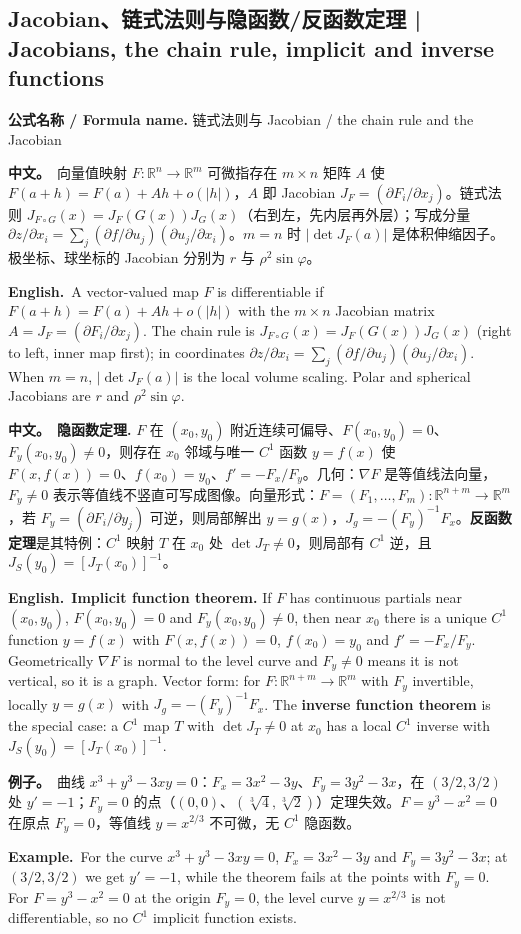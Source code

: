 \documentclass[UTF8,11pt,a4paper]{ctexart}
\newcommand{\R}{\mathbb{R}}
\newcommand{\BOTH}[2]{\par\noindent\textbf{中文。}\ #1\par\noindent\textbf{English.}\ #2\par}
\newcommand{\EX}[2]{\par\noindent\textbf{例子。}\ #1\par\noindent\textbf{Example.}\ #2\par}
\newcommand{\FORMULA}[2]{\par\noindent\textbf{公式名称 / Formula name.} #1 / #2\par}
\begin{document}
\subsection{Jacobian、链式法则与隐函数/反函数定理 | Jacobians, the chain rule, implicit and inverse functions}
\FORMULA{链式法则与 Jacobian}{the chain rule and the Jacobian}
\BOTH{向量值映射 $F:\R^n\to\R^m$ 可微指存在 $m\times n$ 矩阵 $A$ 使 $F(a+h)=F(a)+Ah+o(|h|)$，$A$ 即 Jacobian $J_F=(\partial F_i/\partial x_j)$。链式法则 $J_{F\circ G}(x)=J_F(G(x))J_G(x)$（右到左，先内层再外层）；写成分量 $\partial z/\partial x_i=\sum_j(\partial f/\partial u_j)(\partial u_j/\partial x_i)$。$m=n$ 时 $|\det J_F(a)|$ 是体积伸缩因子。极坐标、球坐标的 Jacobian 分别为 $r$ 与 $\rho^2\sin\varphi$。}{A vector-valued map $F$ is differentiable if $F(a+h)=F(a)+Ah+o(|h|)$ with the $m\times n$ Jacobian matrix $A=J_F=(\partial F_i/\partial x_j)$. The chain rule is $J_{F\circ G}(x)=J_F(G(x))J_G(x)$ (right to left, inner map first); in coordinates $\partial z/\partial x_i=\sum_j(\partial f/\partial u_j)(\partial u_j/\partial x_i)$. When $m=n$, $|\det J_F(a)|$ is the local volume scaling. Polar and spherical Jacobians are $r$ and $\rho^2\sin\varphi$.}
\BOTH{\textbf{隐函数定理.} $F$ 在 $(x_0,y_0)$ 附近连续可偏导、$F(x_0,y_0)=0$、$F_y(x_0,y_0)\ne0$，则存在 $x_0$ 邻域与唯一 $C^1$ 函数 $y=f(x)$ 使 $F(x,f(x))=0$、$f(x_0)=y_0$、$f'=-F_x/F_y$。几何：$\nabla F$ 是等值线法向量，$F_y\ne0$ 表示等值线不竖直可写成图像。向量形式：$F=(F_1,\ldots,F_m):\R^{n+m}\to\R^m$，若 $F_y=(\partial F_i/\partial y_j)$ 可逆，则局部解出 $y=g(x)$，$J_g=-(F_y)^{-1}F_x$。\textbf{反函数定理}是其特例：$C^1$ 映射 $T$ 在 $x_0$ 处 $\det J_T\ne0$，则局部有 $C^1$ 逆，且 $J_S(y_0)=[J_T(x_0)]^{-1}$。}{\textbf{Implicit function theorem.} If $F$ has continuous partials near $(x_0,y_0)$, $F(x_0,y_0)=0$ and $F_y(x_0,y_0)\ne0$, then near $x_0$ there is a unique $C^1$ function $y=f(x)$ with $F(x,f(x))=0$, $f(x_0)=y_0$ and $f'=-F_x/F_y$. Geometrically $\nabla F$ is normal to the level curve and $F_y\ne0$ means it is not vertical, so it is a graph. Vector form: for $F:\R^{n+m}\to\R^m$ with $F_y$ invertible, locally $y=g(x)$ with $J_g=-(F_y)^{-1}F_x$. The \textbf{inverse function theorem} is the special case: a $C^1$ map $T$ with $\det J_T\ne0$ at $x_0$ has a local $C^1$ inverse with $J_S(y_0)=[J_T(x_0)]^{-1}$.}
\EX{曲线 $x^3+y^3-3xy=0$：$F_x=3x^2-3y$、$F_y=3y^2-3x$，在 $(3/2,3/2)$ 处 $y'=-1$；$F_y=0$ 的点（$(0,0)$、$(\sqrt[3]4,\sqrt[3]2)$）定理失效。$F=y^3-x^2=0$ 在原点 $F_y=0$，等值线 $y=x^{2/3}$ 不可微，无 $C^1$ 隐函数。}{For the curve $x^3+y^3-3xy=0$, $F_x=3x^2-3y$ and $F_y=3y^2-3x$; at $(3/2,3/2)$ we get $y'=-1$, while the theorem fails at the points with $F_y=0$. For $F=y^3-x^2=0$ at the origin $F_y=0$, the level curve $y=x^{2/3}$ is not differentiable, so no $C^1$ implicit function exists.}
\end{document}
